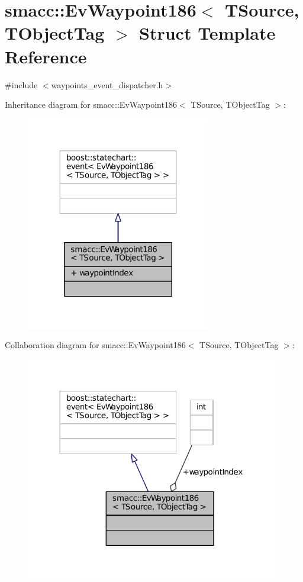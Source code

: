 \hypertarget{structsmacc_1_1EvWaypoint186}{}\section{smacc\+:\+:Ev\+Waypoint186$<$ T\+Source, T\+Object\+Tag $>$ Struct Template Reference}
\label{structsmacc_1_1EvWaypoint186}


{\ttfamily \#include $<$waypoints\+\_\+event\+\_\+dispatcher.\+h$>$}



Inheritance diagram for smacc\+:\+:Ev\+Waypoint186$<$ T\+Source, T\+Object\+Tag $>$\+:
\nopagebreak
\begin{figure}[H]
\begin{center}
\leavevmode
\includegraphics[width=227pt]{structsmacc_1_1EvWaypoint186__inherit__graph}
\end{center}
\end{figure}


Collaboration diagram for smacc\+:\+:Ev\+Waypoint186$<$ T\+Source, T\+Object\+Tag $>$\+:
\nopagebreak
\begin{figure}[H]
\begin{center}
\leavevmode
\includegraphics[width=312pt]{structsmacc_1_1EvWaypoint186__coll__graph}
\end{center}
\end{figure}
